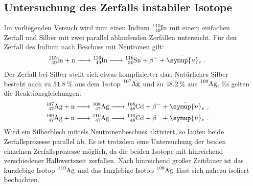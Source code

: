 \subsection{Untersuchung des Zerfalls instabiler Isotope}
Im vorliegenden Versuch wird zum einen Indium $\ce{^{115}_49In}$ mit einem einfachen Zerfall und Silber mit zwei parallel ablaufenden Zerfällen untersucht.
Für den Zerfall des Indium nach Beschuss mit Neutronen gilt:
\begin{align}
  \label{eqn:indium}
  \ce{^{115}_49In + n -> ^{116}_49In -> ^{116}_50Sn + \beta ^{-} + \bar{\symup{\nu}}_e} \text{ .}
\end{align}
Der Zerfall bei Silber stellt sich etwas komplizierter dar.
Natürliches Silber besteht nach \cite{silber} zu $\SI{51.8}{\percent}$ aus dem Isotop $\ce{^{107}Ag}$ und zu $\SI{48.2}{\percent}$ aus $\ce{^{109}Ag}$.
Es gelten die Reaktionsgleichungen:
\begin{gather}
  \label{eqn:silver}
  \ce{^{107}_47Ag + n -> ^{108}_47Ag -> ^{108}_48Cd + \beta^{-} + \bar{\symup{\nu}}_e}\text{ ,}\\
  \ce{^{109}_47Ag + n -> ^{110}_47Ag -> ^{110}_48Cd + \beta^{-} + \bar{\symup{\nu}}_e} \text{ .}
\end{gather}
Wird ein Silberblech mittels Neutronenbeschuss aktiviert, so laufen beide Zerfallsprozesse parallel ab. Es ist trotzdem eine Untersuchung der beiden einzelnen Zerfallsprozesse möglich, da die beiden Isotope mit hinreichend verschiedener Halbwertszeit zerfallen.
Nach hinreichend großer Zeitdauer ist das kurzlebige Isotop $\ce{^{110}Ag}$ und das langlebige Isotop $\ce{^{108}Ag}$ lässt sich nahezu isoliert beobachten.

